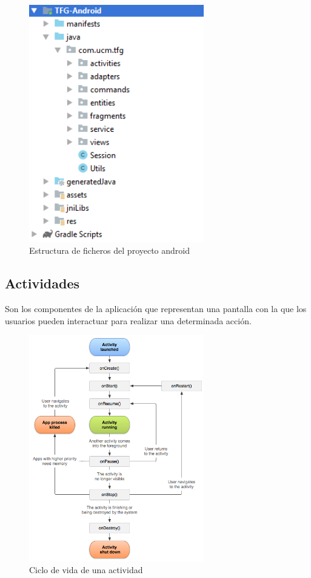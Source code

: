 \begin{figure}[H]
    \centering
    \includegraphics[width=3in]{figures/chapter-4/android_project_structure.png}
    \caption{Estructura de ficheros del proyecto android}
\end{figure}

\subsection{Actividades}
\label{makereference4.3.1}
Son los componentes de la aplicación que representan una pantalla con la que los usuarios pueden interactuar para realizar una determinada acción.

\begin{figure}[H]
    \centering
    \includegraphics[width=3in]{figures/chapter-4/activity_lifecycle.png}
    \caption{Ciclo de vida de una actividad}
\end{figure}

